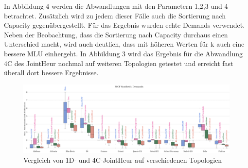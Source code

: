 \documentclass[sigconf,noacm,review]{acmart}
\begin{document}
In Abbildung 4 werden die Abwandlungen mit den Parametern 1,2,3 und 4 betrachtet. Zusätzlich wird zu jedem dieser Fälle auch die Sortierung nach Capacity gegenübergestellt. Für das Ergebnis wurden echte Demands verwendet. Neben der Beobachtung, dass die Sortierung nach Capacity durchaus einen Unterschied macht, wird auch deutlich, dass mit höheren Werten für k auch eine bessere MLU einhergeht. In Abbildung 3 wird das Ergebnis für die Abwandlung 4C des JointHeur nochmal auf weiteren Topologien getestet und erreicht fast überall dort bessere Ergebnisse.
\begin{figure}[h]
  \centering 
  \includegraphics[width=\linewidth]{abbildungen/PNG-Bild 3}
  \caption{Vergleich von 1D- und 4C-JointHeur auf verschiedenen Topologien}
\end{figure}
\end{document}

